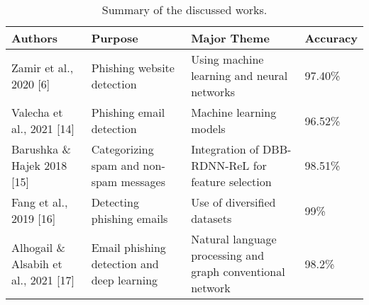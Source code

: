 \begin{table}[ht]
    \centering
    \caption{Summary of the discussed works.}
    \label{tbl:c2:comparison_table}
    \begin{tabular}{p{4cm}p{4cm}p{4cm}p{2cm}}
    \hline
    \textbf{Authors} & \textbf{Purpose} & \textbf{Major Theme} & \textbf{Accuracy} \\
    \hline
    Zamir et al., 2020 [6] & Phishing website detection & Using machine learning and neural networks & 97.40\% \\
    \hline
    Valecha et al., 2021 [14] & Phishing email detection & Machine learning models & 96.52\% \\
    \hline
    Barushka \& Hajek 2018 [15] & Categorizing spam and non-spam messages & Integration of DBB-RDNN-ReL for feature selection & 98.51\% \\
    \hline
    Fang et al., 2019 [16] & Detecting phishing emails & Use of diversified datasets & 99\% \\
    \hline
    Alhogail \& Alsabih et al., 2021 [17] & Email phishing detection and deep learning & Natural language processing and graph conventional network & 98.2\% \\
    \hline
    \end{tabular}
    \end{table}